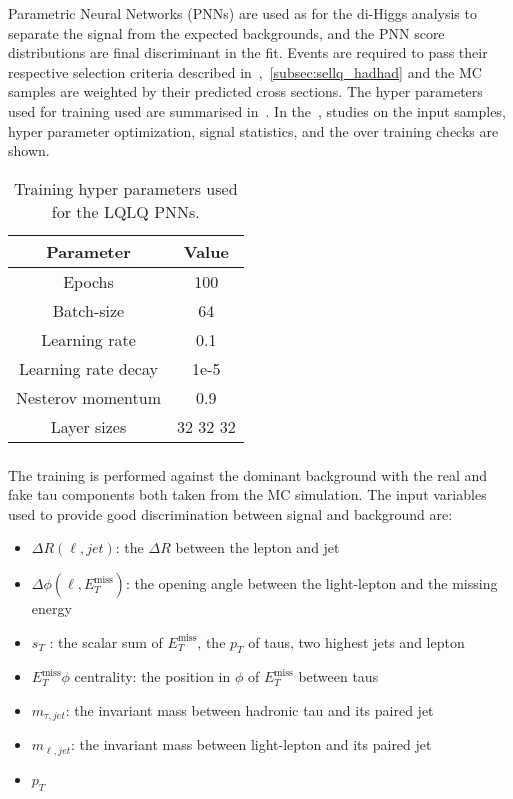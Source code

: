 \label{sec:mva_lq}
Parametric Neural Networks (PNNs) are used as for the di-Higgs analysis to separate the signal from the expected backgrounds, and the PNN score distributions are final discriminant in the fit. Events are required to pass their respective selection criteria described in~,~\ref{subsec:sellq_hadhad} and the MC samples are weighted by their predicted cross sections.  The hyper parameters used for training used are summarised in~. In the~, studies on the input samples, hyper parameter optimization, signal statistics, and the over training checks are shown.

\FloatBarrier

\begin{table}
\centering
\small
\begin{tabular}{|c|c|}
\hline
Parameter & Value\\
\hline
Epochs & 100\\
Batch-size & 64\\
Learning rate & 0.1\\
Learning rate decay & 1e-5\\
Nesterov momentum & 0.9 \\
Layer sizes & 32 32 32\\
\hline
\end{tabular}
\caption{Training hyper parameters used for the LQLQ PNNs.}
\label{tab:hyper_parameters_PNN_LQ}
\end{table}

\subsubsection{\lephad}
The training is performed against the dominant \ttbar background with the real and fake tau components both taken from the MC simulation.
The input variables used to provide good discrimination between signal and background are:
\begin{itemize}
    \item $\Delta R(\ell,jet)$: the $\Delta R$ between the lepton and jet
    \item $\Delta \phi(\ell,E_{T}^{\mathrm{miss}})$: the opening angle between the light-lepton and the missing energy
    \item $s_{T}$ : the scalar sum of $E_{T}^{\mathrm{miss}}$, the $p_{T}$ of taus, two highest jets and lepton
    \item $E_{T}^{\mathrm{miss}} \phi$ centrality: the position in $\phi$ of $E_{T}^{\mathrm{miss}}$ between taus
    \item $m_{\tau,jet}$: the invariant mass between hadronic tau and its paired jet
    \item $m_{\ell,jet}$: the invariant mass between light-lepton and its paired jet
    \item \tauhad $p_T$
\end{itemize}

